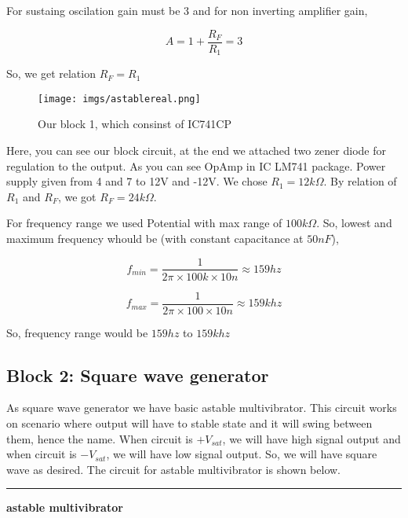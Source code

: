 \documentclass{article}
\begin{document}
For sustaing oscilation gain must be 3 and for non inverting amplifier gain, 

\begin{equation}
\label{eq:org73b45f1}
  A = 1+\frac{R_{F}}{R_{1}} = 3
\end{equation}

So, we get relation \(R_{F}=R_{1}\)


\begin{figure}[htbp]
\centering
\texttt{[image: imgs/astablereal.png]}
\caption{\label{fig:org5dd18e5}Our block 1, which consinst of IC741CP}
\end{figure}


Here, you can see our block circuit, at the end we attached two zener diode for regulation to the output. As you can see OpAmp in IC LM741 package. Power supply given from  4 and 7 to 12V and -12V. We chose \(R_{1}=12k\Omega\). By relation of \(R_{1}\) and \(R_{F}\), we got \(R_{F}=24k\Omega\).

For frequency range we used Potential with max range of \(100k\Omega\). So, lowest and maximum frequency whould be (with constant capacitance at \(50nF\)),

\begin{equation*}
\label{eq:org0cec55f}
  f_{min} = \frac{1}{2\pi\times100k\times 10n} \approx 159 hz
\end{equation*}

\begin{equation*}
\label{eq:org798bb60}
  f_{max} = \frac{1}{2\pi\times100\times 10n} \approx 159k hz
\end{equation*}

So, frequency range would be \(159 hz\) to \(159k hz\)


\subsection{Block 2: Square wave generator}
\label{sec:org6828c5d}

As square wave generator we have basic astable multivibrator. This circuit works on scenario where output will have to stable state and it will swing between them, hence the name. When circuit is \(+V_{sat}\), we will have high signal output and when circuit is \(-V_{sat}\), we will have low signal output. So, we will have square wave as desired. The circuit for astable multivibrator is shown below.

\noindent\rule{\textwidth}{0.5pt}
\textbf{\textbf{astable multivibrator}}
\end{document}
